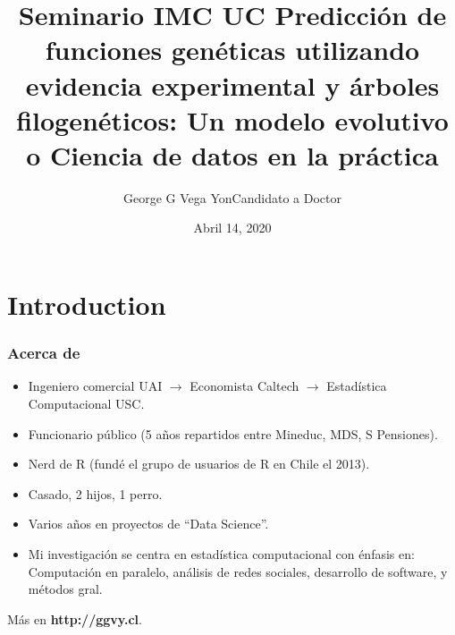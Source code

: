 \documentclass[aspectratio=169, 9pt]{beamer}\usepackage[]{graphicx}\usepackage[]{color}
\title[Computational Stats]{
{\small Seminario IMC UC}\linebreak
Predicción de funciones genéticas utilizando evidencia experimental y árboles filogenéticos: Un modelo evolutivo
\linebreak o {\small Ciencia de datos en la práctica}
}
\author[ggvy.cl]{George G Vega Yon\linebreak Candidato a Doctor}
\institute[USC-PREVMED]{University of Southern California, Department of Preventive Medicine}
\date{Abril 14, 2020}
\begin{document}
\begin{frame}%
\maketitle
\end{frame}


\section{Introduction}

\begin{frame}
\frametitle{Acerca de}
\begin{itemize}
\item Ingeniero comercial UAI \pause$\to$ Economista Caltech \pause$\to$ Estadística Computacional USC. \pause
\item Funcionario público (5 años repartidos entre Mineduc, MDS, S Pensiones).\pause
\item Nerd de R (fundé el grupo de usuarios de R en Chile el 2013).\pause
\item Casado, 2 hijos, 1 perro.\pause
\item Varios años en proyectos de ``Data Science''.\pause
\item Mi investigación se centra en estadística computacional con énfasis en: Computación en paralelo, análisis de redes sociales, desarrollo de software, y métodos gral.
\end{itemize}\pause

Más en \textbf{http://ggvy.cl}.

\end{frame}

\end{document}
